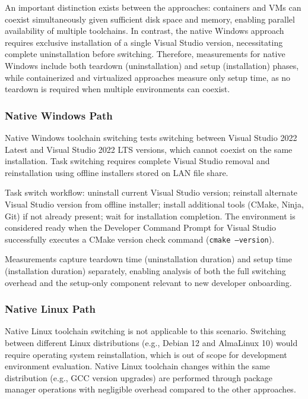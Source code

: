 An important distinction exists between the approaches: containers and VMs can coexist simultaneously given sufficient disk space and memory, enabling parallel availability of multiple toolchains.
In contrast, the native Windows approach requires exclusive installation of a single Visual Studio version, necessitating complete uninstallation before switching.
Therefore, measurements for native Windows include both teardown (uninstallation) and setup (installation) phases, while containerized and virtualized approaches measure only setup time, as no teardown is required when multiple environments can coexist.

\subsubsection{Native Windows Path}

Native Windows toolchain switching tests switching between Visual Studio 2022 Latest and Visual Studio 2022 LTS versions, which cannot coexist on the same installation.
Task switching requires complete Visual Studio removal and reinstallation using offline installers stored on LAN file share.

Task switch workflow: uninstall current Visual Studio version; reinstall alternate Visual Studio version from offline installer; install additional tools (CMake, Ninja, Git) if not already present; wait for installation completion.
The environment is considered ready when the Developer Command Prompt for Visual Studio successfully executes a CMake version check command (\texttt{cmake --version}).

Measurements capture teardown time (uninstallation duration) and setup time (installation duration) separately, enabling analysis of both the full switching overhead and the setup-only component relevant to new developer onboarding.

\subsubsection{Native Linux Path}

Native Linux toolchain switching is not applicable to this scenario.
Switching between different Linux distributions (e.g., Debian 12 and AlmaLinux 10) would require operating system reinstallation, which is out of scope for development environment evaluation.
Native Linux toolchain changes within the same distribution (e.g., GCC version upgrades) are performed through package manager operations with negligible overhead compared to the other approaches.

